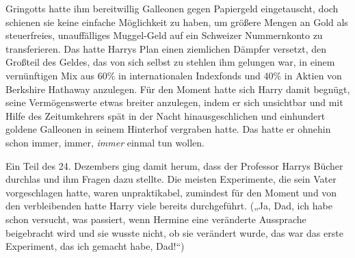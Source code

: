 Gringotts hatte ihm bereitwillig Galleonen gegen Papiergeld eingetauscht, doch schienen sie keine einfache Möglichkeit zu haben, um größere Mengen an Gold als steuerfreies, unauffälliges Muggel-Geld auf ein Schweizer Nummernkonto zu transferieren. Das hatte Harrys Plan einen ziemlichen Dämpfer versetzt, den Großteil des Geldes, das von sich selbst zu stehlen ihm gelungen war, in einem vernünftigen Mix aus 60\% in internationalen Indexfonds und 40\% in Aktien von Berkshire Hathaway anzulegen.%
Für den Moment hatte sich Harry damit begnügt, seine Vermögenswerte etwas breiter anzulegen, indem er sich unsichtbar und mit Hilfe des Zeitumkehrers spät in der Nacht hinausgeschlichen und einhundert goldene Galleonen in seinem Hinterhof vergraben hatte. Das hatte er ohnehin schon immer, immer, \emph{immer} einmal tun wollen.

Ein Teil des 24. Dezembers ging damit herum, dass der Professor Harrys Bücher durchlas und ihm Fragen dazu stellte. Die meisten Experimente, die sein Vater vorgeschlagen hatte, waren unpraktikabel, zumindest für den Moment und von den verbleibenden hatte Harry viele bereits durchgeführt. („Ja, Dad, ich habe schon versucht, was passiert, wenn Hermine eine veränderte Aussprache beigebracht wird und sie wusste nicht, ob sie verändert wurde, das war das erste Experiment, das ich gemacht habe, Dad!“)

